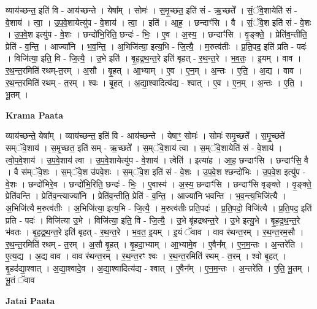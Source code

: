 \documentclass[17pt]{extarticle}
\begin{document}
व्याय॑च्छन्त॒ इति॑ वि - आय॑च्छन्ते । येषा᳚म् । सोमः॑ । स॒मृ॒च्छत॒ इति॑ सं - ऋ॒च्छते᳚ । सं॒ॅवे॒शायेति॑ सं - वे॒शाय॑ । त्वा॒ । उ॒प॒वे॒शायेत्यु॑प - वे॒शाय॑ । त्वा॒ । इति॑ । आ॒ह॒ । छन्दाꣳ॑सि । वै । सं॒ॅवे॒श इति॑ सं - वे॒शः । उ॒प॒वे॒श इत्यु॑प - वे॒शः । छन्दो॑भि॒रिति॒ छन्दः॑ - भिः॒ । ए॒व । अ॒स्य॒ । छन्दाꣳ॑सि । वृ॒ङ्क्ते॒ । प्रेति॑व॒न्तीति॒ प्रेति॑ - व॒न्ति॒ । आज्या॑नि । भ॒व॒न्ति॒ । अ॒भिजि॑त्या॒ इत्य॒भि - जि॒त्यै॒ । म॒रुत्व॑तीः । प्र॒ति॒पद॒ इति॑ प्रति - पदः॑ । विजि॑त्या॒ इति॒ वि - जि॒त्यै॒ । उ॒भे इति॑ । बृ॒ह॒द्र॒थ॒न्त॒रे इति॑ बृहत् - र॒थ॒न्त॒रे । भ॒व॒तः॒ । इ॒यम् । वाव । र॒थ॒न्त॒रमिति॑ रथम्-त॒रम् । अ॒सौ । बृ॒हत् । आ॒भ्याम् । ए॒व । ए॒न॒म् । अ॒न्तः । ए॒ति॒ । अ॒द्य । वाव । र॒थ॒न्त॒रमिति॑ रथम् - त॒रम् । श्वः । बृ॒हत् । अ॒द्या॒श्वादित्य॑द्य - श्वात् । ए॒व । ए॒न॒म् । अ॒न्तः । ए॒ति॒ । भू॒तम् ।  \newline


\textbf{Krama Paata} \newline

व्याय॑च्छन्ते॒ येषा᳚म् । व्याय॑च्छन्त॒ इति॑ वि - आय॑च्छन्ते । येषाꣳ॒॒ सोमः॑ । सोमः॑ समृ॒च्छते᳚ । स॒मृ॒च्छते॑ सम्ॅवे॒शाय॑ । स॒मृ॒च्छत॒ इति॑ सम् - ऋ॒च्छते᳚ । स॒म्ॅवे॒शाय॑ त्वा । स॒म्ॅवे॒शायेति॑ सं - वे॒शाय॑ । त्वो॒प॒वे॒शाय॑ । उ॒प॒वे॒शाय॑ त्वा । उ॒प॒वे॒शायेत्यु॑प - वे॒शाय॑ । त्वेति॑ । इत्या॑ह । आ॒ह॒ छन्दाꣳ॑सि । छन्दाꣳ॑सि॒ वै । वै स॑म्ॅवे॒शः । स॒म्ॅवे॒श उ॑पवे॒शः । स॒म्ॅवे॒श इति॑ सं - वे॒शः । उ॒प॒वे॒श श्छन्दो॑भिः । उ॒प॒वे॒श इत्यु॑प - वे॒शः । छन्दो॑भिरे॒व । छन्दो॑भि॒रिति॒ छन्दः॑ - भिः॒ । ए॒वास्य॑ । अ॒स्य॒ छन्दाꣳ॑सि । छन्दाꣳ॑सि वृङ्क्ते । वृ॒ङ्क्ते॒ प्रेति॑वन्ति । प्रेति॑व॒न्त्याज्या॑नि । प्रेति॑व॒न्तीति॒ प्रेति॑ - व॒न्ति॒ । आज्या॑नि भवन्ति । भ॒व॒न्त्य॒भिजि॑त्यै । अ॒भिजि॑त्यै म॒रुत्व॑तीः । अ॒भिजि॑त्या॒ इत्य॒भि - जि॒त्यै॒ । म॒रुत्व॑तीः प्रति॒पदः॑ । प्र॒ति॒पदो॒ विजि॑त्यै । प्र॒ति॒पद॒ इति॑ प्रति - पदः॑ । विजि॑त्या उ॒भे । विजि॑त्या॒ इति॒ वि - जि॒त्यै॒ । उ॒भे बृ॑हद्रथन्त॒रे । उ॒भे इत्यु॒भे । बृ॒ह॒द्र॒थ॒न्त॒रे भ॑वतः । बृ॒ह॒द्र॒थ॒न्त॒रे इति॑ बृहत् - र॒थ॒न्त॒रे । भ॒व॒त॒ इ॒यम् । इ॒यं ॅवाव । वाव र॑थन्त॒रम् । र॒थ॒न्त॒रम॒सौ । र॒थ॒न्त॒रमिति॑ रथम् - त॒रम् । अ॒सौ बृ॒हत् । बृ॒हदा॒भ्याम् । आ॒भ्यामे॒व । ए॒वैन᳚म् । ए॒न॒म॒न्तः । अ॒न्तरे॑ति । ए॒त्य॒द्य । अ॒द्य वाव । वाव र॑थन्त॒रम् । र॒थ॒न्त॒रꣳ श्वः । र॒थ॒न्त॒रमिति॑ रथम् - त॒रम् । श्वो बृ॒हत् । बृ॒हद॑द्या॒श्वात् । अ॒द्या॒श्वादे॒व । अ॒द्या॒श्वादित्य॑द्य - श्वात् । ए॒वैन᳚म् । ए॒न॒म॒न्तः । अ॒न्तरे॑ति । ए॒ति॒ भू॒तम् । भू॒तं ॅवाव \newline

\textbf{Jatai Paata} \newline
\end{document}

